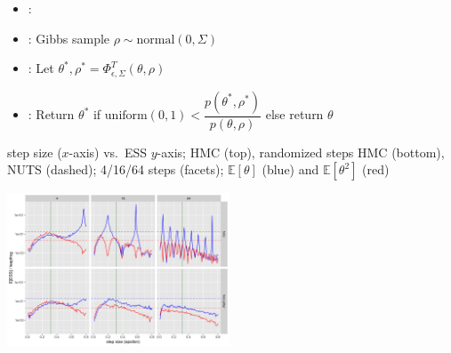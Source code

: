 \documentclass[10pt]{report}
\begin{document}
\begin{itemize}
\item {}:
\item {}: Gibbs sample $\rho \sim \textrm{normal}(0, \Sigma)$
\item {}:  Let $\theta^*, \rho^* = \Phi_{\epsilon,\Sigma}^T(\theta, \rho)$
\item {}: Return $\theta^*$ if $\textrm{uniform}(0, 1) <
  \dfrac{p(\theta^*, \rho^*)}
       {p(\theta, \rho)}$ else return $\theta$
\end{itemize}

\begin{subitemize}
\item step size ($x$-axis) vs.\ ESS $y$-axis; HMC (top), randomized
  steps HMC (bottom), NUTS (dashed); 
  4/16/64 steps (facets); $\mathbb{E}[\theta]$ (blue) and
  $\mathbb{E}[\theta^2]$ (red)
\end{subitemize}
\vspace*{-3pt}
\begin{center}
  \includegraphics[width=2.6in]{img/hmc-harmonics.png}
\end{center}
\end{document}

